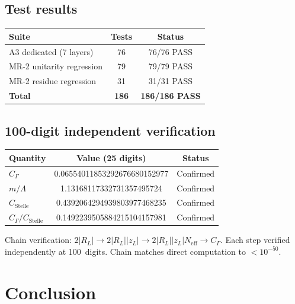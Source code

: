 \documentclass[11pt,a4paper]{article}
\newcommand{\Neff}{N_{\mathrm{eff}}}
\begin{document}
\subsection{Test results}

\begin{center}
\begin{tabular}{lcc}
\toprule
Suite & Tests & Status \\
\midrule
A3 dedicated (7 layers) & 76 & 76/76 PASS \\
MR-2 unitarity regression & 79 & 79/79 PASS \\
MR-2 residue regression & 31 & 31/31 PASS \\
\midrule
\textbf{Total} & \textbf{186} & \textbf{186/186 PASS} \\
\bottomrule
\end{tabular}
\end{center}

\subsection{100-digit independent verification}

\begin{center}
\begin{tabular}{lcc}
\toprule
Quantity & Value (25 digits) & Status \\
\midrule
$C_\Gamma$ & 0.06554011853292676680152977 & Confirmed \\
$m/\Lambda$ & 1.13168117332731357495724 & Confirmed \\
$C_{\mathrm{Stelle}}$ & 0.4392064294939803977468235 & Confirmed \\
$C_\Gamma/C_{\mathrm{Stelle}}$ & 0.1492239505884215104157981 & Confirmed \\
\bottomrule
\end{tabular}
\end{center}

\noindent
Chain verification: $2|R_L| \to 2|R_L||z_L| \to
2|R_L||z_L|\Neff \to C_\Gamma$.  Each step verified independently
at 100~digits.  Chain matches direct computation to $< 10^{-50}$.


\section{Conclusion}
\label{sec:conclusion}
\end{document}
